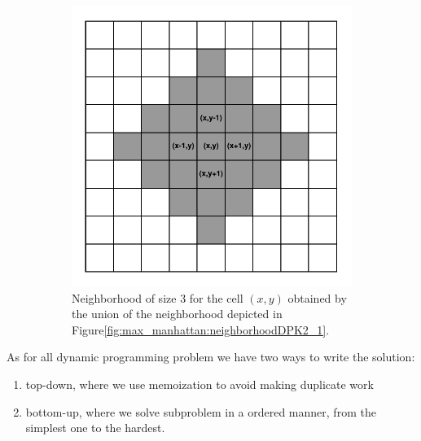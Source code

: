 \begin{figure}
	\hfill
	
	\begin{subfigure}[t]{0.4\textwidth}
		\centering
		\includegraphics[width=\textwidth]{sources/max_manhattan/images/neighborhoodDPK2_2}
		\caption[]{Neighborhood of size $3$ for the cell $(x,y)$ obtained by the union of the neighborhood depicted in Figure\ref{fig:max_manhattan:neighborhoodDPK2_1}.}
		\label{fig:max_manhattan:neighborhoodDPK2_2}
	 \end{subfigure}
	 \label{}
	 \caption{}
\end{figure}


As for all dynamic programming problem we have two ways to write the solution: \begin{enumerate}
	\item top-down, where we use memoization to avoid making duplicate work
	\item bottom-up, where we solve subproblem in a ordered manner, from the simplest one to the hardest.
\end{enumerate}

